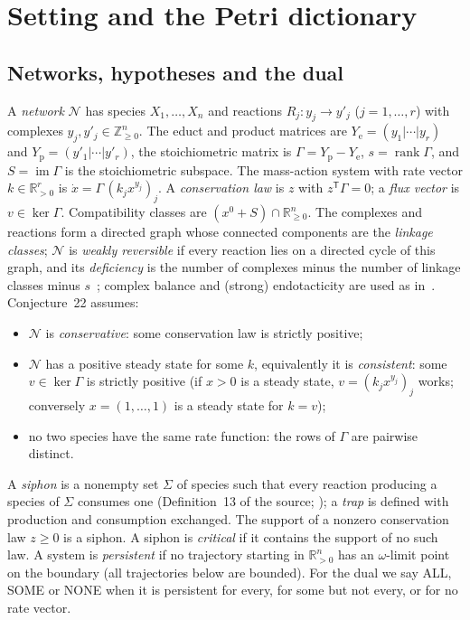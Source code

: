 \documentclass[11pt,a4paper]{report}
\newcommand{\Net}{\mathcal{N}}
\newcommand{\Ye}{Y_{\mathrm e}}
\newcommand{\Yp}{Y_{\mathrm p}}
\newcommand{\im}{\operatorname{im}}
\newcommand{\Rp}{\mathbb{R}_{>0}}
\newcommand{\Rnn}{\mathbb{R}_{\ge 0}}
\newcommand{\tp}{^{\mathsf T}}
\begin{document}
\section{Setting and the Petri dictionary}\label{sec:setting}

\subsection{Networks, hypotheses and the dual}

A \emph{network} \(\Net\) has species \(X_1,\dots,X_n\) and reactions \(R_j\colon y_j\to y'_j\) (\(j=1,\dots,r\)) with
complexes \(y_j,y'_j\in\mathbb{Z}^n_{\ge0}\). The educt and product matrices are \(\Ye=(y_1|\cdots|y_r)\) and
\(\Yp=(y'_1|\cdots|y'_r)\), the stoichiometric matrix is \(\Gamma=\Yp-\Ye\), \(s=\operatorname{rank}\Gamma\), and
\(S=\im\Gamma\) is the stoichiometric subspace. The mass-action system with rate vector \(k\in\Rp^r\) is
\(\dot x=\Gamma\,(k_jx^{y_j})_j\). A \emph{conservation law} is \(z\) with \(z\tp\Gamma=0\); a \emph{flux vector} is
\(v\in\ker\Gamma\). Compatibility classes are \((x^0+S)\cap\Rnn^n\). The complexes and reactions form a directed graph whose
connected components are the \emph{linkage classes}; \(\Net\) is \emph{weakly reversible} if every reaction lies on a
directed cycle of this graph, and its \emph{deficiency} is the number of complexes minus the number of linkage classes
minus \(s\)~\autocite{Feinberg2019}; complex balance and (strong) endotacticity are used as
in~\autocite{HornJackson1972,CraciunNazarovPantea2013,GopalkrishnanMillerShiu2014}. Conjecture~22 assumes:
\begin{itemize}
\item[(H1)] \(\Net\) is \emph{conservative}: some conservation law is strictly positive;
\item[(H2)] \(\Net\) has a positive steady state for some \(k\), equivalently it is \emph{consistent}: some
\(v\in\ker\Gamma\) is strictly positive (if \(x>0\) is a steady state, \(v=(k_jx^{y_j})_j\) works; conversely
\(x=(1,\dots,1)\) is a steady state for \(k=v\));
\item[(H3)] no two species have the same rate function: the rows of \(\Gamma\) are pairwise distinct.
\end{itemize}
A \emph{siphon} is a nonempty set \(\Sigma\) of species such that every reaction producing a species of \(\Sigma\)
consumes one (Definition~13 of the source; \autocite{ShiuSturmfels2010,AngeliDeLeenheerSontag2007}); a \emph{trap}
is defined with production and consumption exchanged. The support of a nonzero conservation law \(z\ge0\) is a
siphon. A siphon is \emph{critical} if it contains the support of no such law. A system is \emph{persistent} if no
trajectory starting in \(\Rp^n\) has an \(\omega\)-limit point on the boundary (all trajectories below are bounded).
For the dual we say ALL, SOME or NONE when it is persistent for every, for some but not every, or for no rate
vector.
\end{document}
